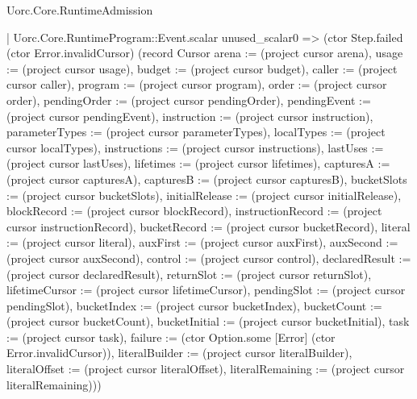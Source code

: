 \begin{lexlean}{Uorc.Core.RuntimeAdmission}
\begin{semanticmodule}
{          | Uorc.Core.RuntimeProgram::Event.scalar unused_scalar0 => (ctor Step.failed (ctor Error.invalidCursor) (record Cursor {arena := (project cursor arena), usage := (project cursor usage), budget := (project cursor budget), caller := (project cursor caller), program := (project cursor program), order := (project cursor order), pendingOrder := (project cursor pendingOrder), pendingEvent := (project cursor pendingEvent), instruction := (project cursor instruction), parameterTypes := (project cursor parameterTypes), localTypes := (project cursor localTypes), instructions := (project cursor instructions), lastUses := (project cursor lastUses), lifetimes := (project cursor lifetimes), capturesA := (project cursor capturesA), capturesB := (project cursor capturesB), bucketSlots := (project cursor bucketSlots), initialRelease := (project cursor initialRelease), blockRecord := (project cursor blockRecord), instructionRecord := (project cursor instructionRecord), bucketRecord := (project cursor bucketRecord), literal := (project cursor literal), auxFirst := (project cursor auxFirst), auxSecond := (project cursor auxSecond), control := (project cursor control), declaredResult := (project cursor declaredResult), returnSlot := (project cursor returnSlot), lifetimeCursor := (project cursor lifetimeCursor), pendingSlot := (project cursor pendingSlot), bucketIndex := (project cursor bucketIndex), bucketCount := (project cursor bucketCount), bucketInitial := (project cursor bucketInitial), task := (project cursor task), failure := (ctor Option.some [Error] (ctor Error.invalidCursor)), literalBuilder := (project cursor literalBuilder), literalOffset := (project cursor literalOffset), literalRemaining := (project cursor literalRemaining)}))
}
\end{semanticmodule}
\end{lexlean}
